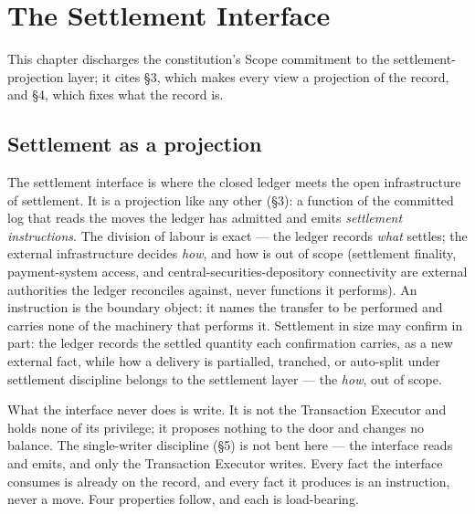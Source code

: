 
\section{The Settlement Interface}\label{ch:settlement}

This chapter discharges the constitution's Scope commitment to the
settlement-projection layer; it cites \S3, which makes every view a projection of
the record, and \S4, which fixes what the record is.

\subsection{Settlement as a projection}

The settlement interface is where the closed ledger meets the open infrastructure
of settlement. It is a projection like any other (\S3): a function of the committed
log that reads the moves the ledger has admitted and emits \emph{settlement
instructions}. The division of labour is exact --- the ledger records \emph{what}
settles; the external infrastructure decides \emph{how}, and how is out of scope
(settlement finality, payment-system access, and central-securities-depository
connectivity are external authorities the ledger reconciles against, never
functions it performs). An instruction is the boundary object: it names the
transfer to be performed and carries none of the machinery that performs it.
Settlement in size may confirm in part: the ledger records the settled quantity each
confirmation carries, as a new external fact, while how a delivery is partialled,
tranched, or auto-split under settlement discipline belongs to the settlement layer ---
the \emph{how}, out of scope.

What the interface never does is write. It is not the Transaction Executor and
holds none of its privilege; it proposes nothing to the door and changes no
balance. The single-writer discipline (\S5) is not bent here --- the interface
reads and emits, and only the Transaction Executor writes. Every fact the interface
consumes is already on the record, and every fact it produces is an instruction,
never a move. Four properties follow, and each is load-bearing.

